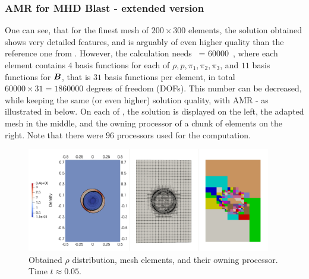 \subsubsection{AMR for MHD Blast - extended version}
One can see, that for the finest mesh of $200\times300$ elements, the solution obtained shows very detailed features, and is arguably of even higher quality than the reference one from \cite{blastNew1}. However, the calculation needs
 \ = 60000\ ,
\ee
where each element contains $4$ basis functions for each of $\rho, p, \pi_1, \pi_2, \pi_3$, and $11$ basis functions for $\mbox{\boldmath $B$}$, that is $31$ basis functions per element, in total $60000 \times 31 = 1860000$ degrees of freedom (DOFs). This number can be decreased, while keeping the same (or even higher) solution quality, with AMR - as illustrated in  below. On each of , the solution is displayed on the left, the adapted mesh in the middle, and the owning processor of a chunk of elements on the right. Note that there were $96$ processors used for the computation.

\begin{figure}[H]
	\begin{center}
		\includegraphics[width=0.95\textwidth]{img/mhd-blast/new/adapt-full0.jpg}
\vspace{-3mm}
	\caption{Obtained $\rho$ distribution, mesh elements, and their owning processor. Time $t\approx 0.05$.}
	\label{figure:amrBlast1}
	\end{center}
\end{figure}
\vspace{-10mm}

